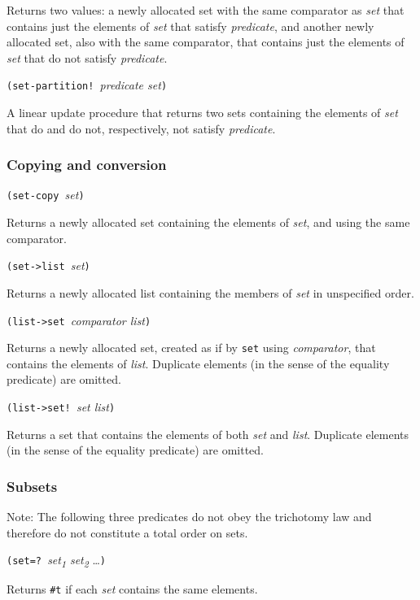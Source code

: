Returns two values: a newly allocated set with the same comparator as
\emph{set} that contains just the elements of \emph{set} that satisfy
\emph{predicate}, and another newly allocated set, also with the same
comparator, that contains just the elements of \emph{set} that do not
satisfy \emph{predicate}.

\texttt{(set-partition!\ }\emph{predicate set}\texttt{)}

A linear update procedure that returns two sets containing the elements
of \emph{set} that do and do not, respectively, not satisfy
\emph{predicate}.

\hypertarget{Copyingandconversion}{\subsubsection{Copying and
conversion}\label{Copyingandconversion}}

\texttt{(set-copy\ }\emph{set}\texttt{)}

Returns a newly allocated set containing the elements of \emph{set}, and
using the same comparator.

\texttt{(set-\textgreater{}list\ }\emph{set}\texttt{)}

Returns a newly allocated list containing the members of \emph{set} in
unspecified order.

\texttt{(list-\textgreater{}set\ }\emph{comparator list}\texttt{)}

Returns a newly allocated set, created as if by \texttt{set} using
\emph{comparator}, that contains the elements of \emph{list}. Duplicate
elements (in the sense of the equality predicate) are omitted.

\texttt{(list-\textgreater{}set!\ }\emph{set list}\texttt{)}

Returns a set that contains the elements of both \emph{set} and
\emph{list}. Duplicate elements (in the sense of the equality predicate)
are omitted.

\hypertarget{Subsets}{\subsubsection{Subsets}\label{Subsets}}

Note: The following three predicates do not obey the trichotomy law and
therefore do not constitute a total order on sets.

\texttt{(set=?\ }\emph{set\textsubscript{1} set\textsubscript{2}}
\ldots{}\texttt{)}

Returns \texttt{\#t} if each \emph{set} contains the same elements.

